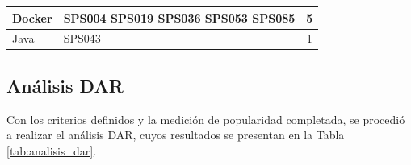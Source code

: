 \begin{table}[H]
\begin{tabular}{|l|p{8cm}|c|}
		\hline
		Docker            & \tiny{SPS004 SPS019 SPS036 SPS053 SPS085}                                                                                                                                                                                                                                                                                                                                                        & 5                          \\
		\hline
		Java              & \tiny{SPS043}                                                                                                                                                                                                                                                                                                                                                                                    & 1                          \\
		\hline
	\end{tabular}
\end{table}

\subsection{Análisis DAR}
Con los criterios definidos y la medición de popularidad completada, se procedió a realizar el análisis DAR, cuyos resultados se presentan en la Tabla \ref{tab:analisis_dar}.

